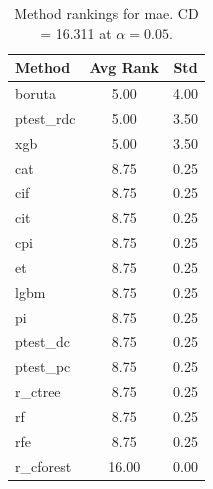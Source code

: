 \begin{table}[h]
\centering
\caption{Method rankings for mae. CD = 16.311 at $\alpha=0.05$.}
\label{tab:ranks_mae}
\begin{tabular}{lcc}
\toprule
Method & Avg Rank & Std \\
\midrule
boruta & 5.00 & 4.00 \\
ptest_rdc & 5.00 & 3.50 \\
xgb & 5.00 & 3.50 \\
cat & 8.75 & 0.25 \\
cif & 8.75 & 0.25 \\
cit & 8.75 & 0.25 \\
cpi & 8.75 & 0.25 \\
et & 8.75 & 0.25 \\
lgbm & 8.75 & 0.25 \\
pi & 8.75 & 0.25 \\
ptest_dc & 8.75 & 0.25 \\
ptest_pc & 8.75 & 0.25 \\
r_ctree & 8.75 & 0.25 \\
rf & 8.75 & 0.25 \\
rfe & 8.75 & 0.25 \\
r_cforest & 16.00 & 0.00 \\
\bottomrule
\end{tabular}
\end{table}